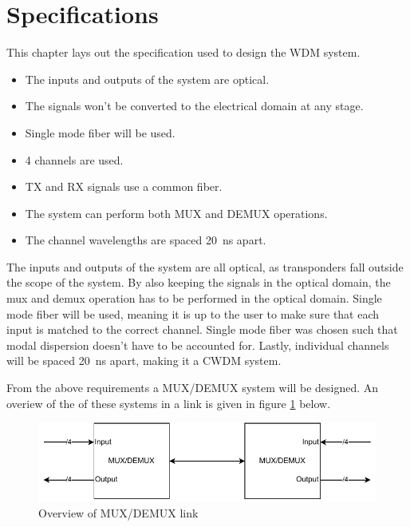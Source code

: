\section{Specifications}
\label{sec:specifications}
This chapter lays out the specification used to design the WDM system.

\begin{itemize}
 \item The inputs and outputs of the system are optical.
 \item The signals won't be converted to the electrical domain at any stage.
 \item Single mode fiber will be used.
 \item 4 channels are used.
 \item TX and RX signals use a common fiber.
 \item The system can perform both MUX and DEMUX operations.
 \item The channel wavelengths are spaced \qty{20}{\ns} apart.
\end{itemize}

The inputs and outputs of the system are all optical, as transponders fall outside the scope of the system. By also keeping the signals in the optical domain, the mux and demux operation has to be performed in the optical domain. Single mode fiber will be used, meaning it is up to the user to make sure that each input is matched to the correct channel. Single mode fiber was chosen such that modal dispersion doesn't have to be accounted for. Lastly, individual channels will be spaced  \qty{20}{\ns} apart, making it a CWDM system.

From the above requirements a MUX/DEMUX system will be designed. An overiew of the of these systems in a link is given in figure \ref{fig:link_overview} below.

\begin{figure}[h]
    \includegraphics[width=\linewidth]{images/link_overview.pdf}
    \caption{Overview of MUX/DEMUX link}
    \label{fig:link_overview}
\end{figure}